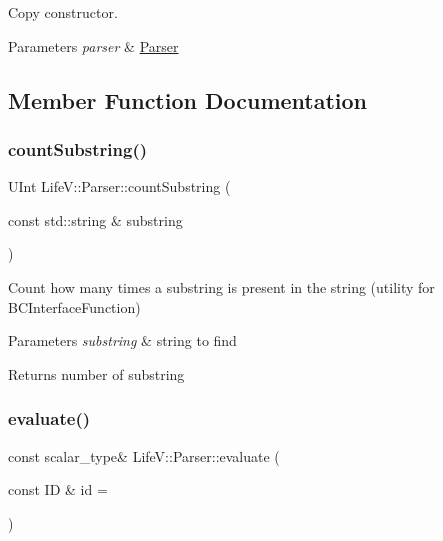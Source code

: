 Copy constructor. 


\begin{DoxyParams}{Parameters}
{\em parser} & \hyperlink{classLifeV_1_1Parser}{Parser} \\
\hline
\end{DoxyParams}


\subsection{Member Function Documentation}
\mbox{\label{classLifeV_1_1Parser_a37ae3af9abcf72ca8e1537ec771b523a}} 
\subsubsection{\texorpdfstring{count\+Substring()}{countSubstring()}}
{\footnotesize\ttfamily U\+Int Life\+V\+::\+Parser\+::count\+Substring (\begin{DoxyParamCaption}\item[{const std\+::string \&}]{substring }\end{DoxyParamCaption})}

Count how many times a substring is present in the string (utility for B\+C\+Interface\+Function)


\begin{DoxyParams}{Parameters}
{\em substring} & string to find \\
\hline
\end{DoxyParams}
\begin{DoxyReturn}{Returns}
number of substring 
\end{DoxyReturn}
\mbox{\label{classLifeV_1_1Parser_ac0e93cf8f4583c7c9f3c83990b4814a5}} 
\subsubsection{\texorpdfstring{evaluate()}{evaluate()}}
{\footnotesize\ttfamily const scalar\+\_\+type\& Life\+V\+::\+Parser\+::evaluate (\begin{DoxyParamCaption}\item[{const ID \&}]{id = {} }\end{DoxyParamCaption})}

